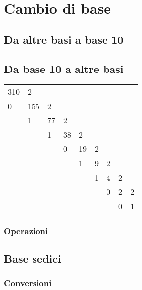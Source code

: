 \section{Cambio di base}
\label{sec:cambiodibase}
\subsection{Da altre basi a base 10}
\subsection{Da base 10 a altre basi}
\begin{tabular}{lllllllll}
\multicolumn{1}{l|}{310} & 2 &  &  &  &  &  &  &  \\ 
\cline{2-2}
\multicolumn{1}{l|}{0} & \multicolumn{1}{l|}{155} & 2 &  &  &  &  &  &  \\ 
\cline{3-3}
& \multicolumn{1}{l|}{1} & \multicolumn{1}{l|}{77} & 2 &  &  &  &  &  \\ 
\cline{4-4}
&  & \multicolumn{1}{l|}{1} & \multicolumn{1}{l|}{38} & 2 &  &  &  &  \\ 
\cline{5-5}
&  &  & \multicolumn{1}{l|}{0} & \multicolumn{1}{l|}{19} & 2 &  &  &  \\ 
\cline{6-6}
&  &  &  & \multicolumn{1}{l|}{1} & \multicolumn{1}{l|}{9} & 2 &  &  \\ 
\cline{7-7}
&  &  &  &  & \multicolumn{1}{l|}{1} & \multicolumn{1}{l|}{4} & 2 &  \\ 
\cline{8-8}
&  &  &  &  &  & \multicolumn{1}{l|}{0} & \multicolumn{1}{l|}{2} & 2 \\ 
\cline{9-9}
&  &  &  &  &  &  & \multicolumn{1}{l|}{0} & 1 \\ 
\end{tabular}
\subsubsection{Operazioni}
\subsection{Base sedici}
\subsubsection{Conversioni}
